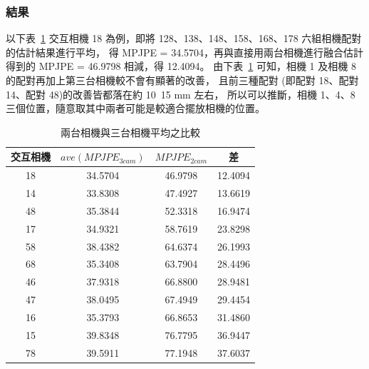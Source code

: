 \subsubsection{結果}
以下表~\ref{ch3_ave_3cam_vs_2cam} 交互相機 18 為例，即將 128、138、148、158、168、178 六組相機配對的估計結果進行平均，
得 MPJPE = 34.5704，再與直接用兩台相機進行融合估計得到的 MPJPE = 46.9798 相減，得 12.4094。
由下表~\ref{ch3_ave_3cam_vs_2cam} 可知，相機 1 及相機 8 的配對再加上第三台相機較不會有顯著的改善，
且前三種配對 (即配對 18、配對 14、配對 48)的改善皆都落在約 10~15 mm 左右，
所以可以推斷，相機 1、4、8 三個位置，隨意取其中兩者可能是較適合擺放相機的位置。
\begin{table}[!ht]
   \caption[兩台相機與三台相機平均之比較]{兩台相機與三台相機平均之比較}
   \centering
   \label{ch3_ave_3cam_vs_2cam}
   \setlength{\tabcolsep}{3pt}
   \renewcommand\arraystretch{1.5}
   \begin{tabular}{c|c|c|c}
      交互相機 & $ave(MPJPE_{3 cam})$ & $MPJPE_{2 cam}$ & 差 \\
      \midrule[2pt]
      18 & 34.5704 & 46.9798 & 12.4094 \\
      14 & 33.8308 & 47.4927 & 13.6619 \\
      48 & 35.3844 & 52.3318 & 16.9474 \\
      17 & 34.9321 & 58.7619 & 23.8298 \\ 
      58 & 38.4382 & 64.6374 & 26.1993 \\
      68 & 35.3408 & 63.7904 & 28.4496 \\
      46 & 37.9318 & 66.8800 & 28.9481 \\  
      47 & 38.0495 & 67.4949 & 29.4454 \\ 
      16 & 35.3793 & 66.8653 & 31.4860 \\ 
      15 & 39.8348 & 76.7795 & 36.9447 \\
      78 & 39.5911 & 77.1948 & 37.6037 \\
   \end{tabular}
\end{table}

